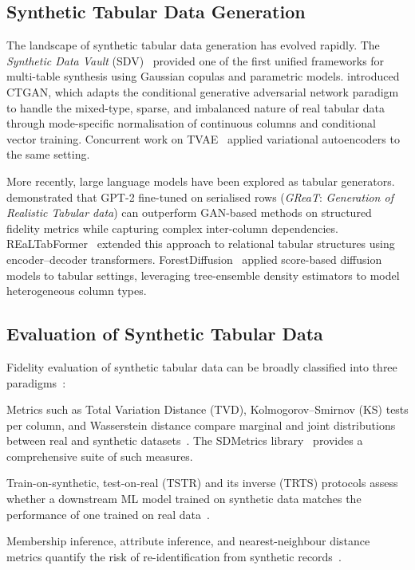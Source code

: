 \documentclass[runningheads]{llncs}
\begin{document}
\subsection{Synthetic Tabular Data Generation}

The landscape of synthetic tabular data generation has evolved rapidly.
The \emph{Synthetic Data Vault} (SDV)~\cite{patki2016synthetic} provided
one of the first unified frameworks for multi-table synthesis using
Gaussian copulas and parametric models.
\citet{xu2019modeling} introduced CTGAN, which adapts the conditional
generative adversarial network paradigm to handle the mixed-type,
sparse, and imbalanced nature of real tabular data through
mode-specific normalisation of continuous columns and conditional
vector training.
Concurrent work on TVAE~\cite{xu2019modeling} applied variational
autoencoders to the same setting.

More recently, large language models have been explored as
tabular generators.
\citet{borisov2023language} demonstrated that GPT-2 fine-tuned on
serialised rows (\emph{GReaT}: \textit{Generation of Realistic
Tabular data}) can outperform GAN-based methods on structured fidelity
metrics while capturing complex inter-column dependencies.
REaLTabFormer~\cite{solatorio2023realtabformer} extended this approach
to relational tabular structures using encoder--decoder transformers.
ForestDiffusion~\cite{jolicoeur2023generating} applied score-based
diffusion models to tabular settings, leveraging tree-ensemble density
estimators to model heterogeneous column types.

\subsection{Evaluation of Synthetic Tabular Data}

Fidelity evaluation of synthetic tabular data can be broadly
classified into three paradigms~\cite{jordon2022synthetic}:

\begin{description}[leftmargin=0pt]
  \item[Statistical fidelity.] Metrics such as Total Variation Distance
    (TVD), Kolmogorov--Smirnov (KS) tests per column, and Wasserstein
    distance compare marginal and joint distributions between real and
    synthetic datasets~\cite{platzer2021holdout}.
    The SDMetrics library~\cite{datacebo2023sdmetrics} provides a
    comprehensive suite of such measures.

  \item[ML utility.] Train-on-synthetic, test-on-real (TSTR) and its
    inverse (TRTS) protocols assess whether a downstream ML model
    trained on synthetic data matches the performance of one trained on
    real data~\cite{esteban2017real}.

  \item[Privacy.] Membership inference, attribute inference, and
    nearest-neighbour distance metrics quantify the risk of re-identification
    from synthetic records~\cite{jordon2022synthetic}.
\end{description}
\end{document}
